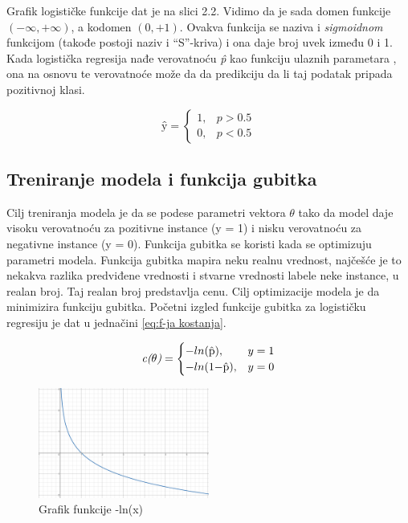 \documentclass[a4paper,12pt]{report}
\begin{document}
Grafik logističke funkcije dat je na slici 2.2. Vidimo da je sada domen funkcije $ (-\infty, +\infty) $, a kodomen $ (0, +1) $. Ovakva funkcija se naziva i \textit{sigmoidnom} funkcijom (takođe postoji naziv i \enquote{S}-kriva) i ona daje broj uvek između 0 i 1. \\
Kada logistička regresija nađe verovatnoću \textit{\^{p}} kao funkciju ulaznih parametara , ona na osnovu te verovatnoće može da da predikciju da li taj podatak pripada pozitivnoj klasi. 

\begin{equation}
  \textit{\^{y}} =
  \begin{cases}
    1, & \textit{\^{p}} > 0.5 \\
    0, & \textit{\^{p}} < 0.5
  \end{cases}
\end{equation}

\subsection{Treniranje modela i funkcija gubitka}

Cilj treniranja modela je da se podese parametri vektora  $\theta$ tako da model daje visoku verovatnoću za pozitivne instance (y = 1) i nisku verovatnoću za negativne instance (y = 0).  Funkcija gubitka se koristi kada se optimizuju parametri modela. Funkcija gubitka mapira neku realnu vrednost, najčešće je to nekakva razlika predviđene vrednosti i stvarne vrednosti labele neke instance, u realan broj. Taj realan broj predstavlja cenu. Cilj optimizacije modela je da minimizira funkciju gubitka. Početni izgled funkcije gubitka za logističku regresiju je dat u jednačini  \ref{eq:f-ja kostanja}. 

\begin{equation} \label{eq:f-ja kostanja}
  \textit{c($\theta$)} =
  \begin{cases}
    -ln($\^{p}$), &  y = 1 \\
    -ln(1 - $\^{p}$), & y = 0
  \end{cases}
\end{equation}

\begin{figure}
    \centering
    \includegraphics[width=0.5\textwidth]{neglog.png}
    \caption{Grafik funkcije -ln(x)}\label{fig:neglog}
\end{figure}
\end{document}
